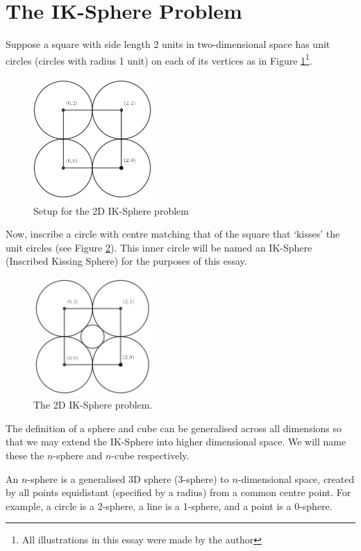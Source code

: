 \section{The IK-Sphere Problem}
Suppose a square with side length 2 units in two-dimensional space has unit circles (circles with radius 1 unit) on each of its vertices as in Figure \ref{fig:2d_Setup_IK_Sphere}\footnote{All illustrations in this essay were made by the author}.
\begin{figure}[H]
    \centering
    \includegraphics[width=0.4\textwidth]{images/2D.png}
    \caption{\label{fig:2d_Setup_IK_Sphere}Setup for the 2D IK-Sphere problem}
\end{figure}
Now, inscribe a circle with centre matching that of the square that `kisses' the unit circles (see Figure \ref{fig:2d_IK_Sphere}). This inner circle will be named an IK-Sphere (Inscribed Kissing Sphere) for the purposes of this essay.
\begin{figure}[H]
    \centering
    \includegraphics[width=0.4\textwidth]{images/2D IK.png}
    \caption{\label{fig:2d_IK_Sphere}The 2D IK-Sphere problem.}
\end{figure}
The definition of a sphere and cube can be generalised across all dimensions so that we may extend the IK-Sphere into higher dimensional space. We will name these the $n$-sphere and $n$-cube respectively.

\begin{definition}[$n$-Sphere]\label{def:n-sphere}
    An $n$-sphere is a generalised 3D sphere (3-sphere) to $n$-dimensional space, created by all points equidistant (specified by a radius) from a common centre point. For example, a circle is a 2-sphere, a line is a 1-sphere, and a point is a 0-sphere.
\end{definition}

